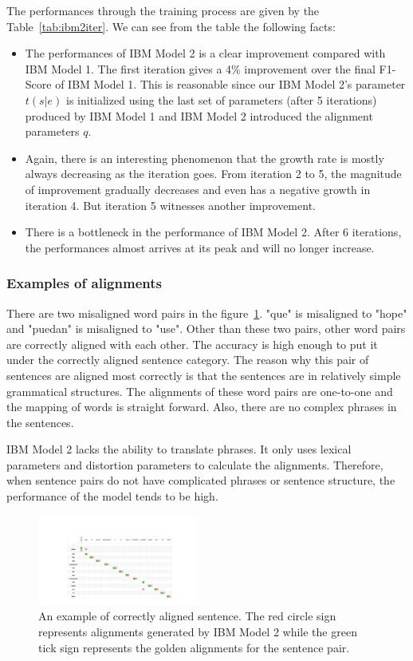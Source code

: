 The performances through the training process are given by the Table~\ref{tab:ibm2iter}. We can see from the table the following facts:
\begin{itemize}
    \item The performances of IBM Model 2 is a clear improvement compared with IBM Model 1. The first iteration gives a 4\% improvement over the final F1-Score of IBM Model 1. This is reasonable since our IBM Model 2's parameter $t(s|e)$ is initialized using the last set of parameters (after 5 iterations) produced by IBM Model 1 and IBM Model 2 introduced the alignment parameters $q$.
    \item Again, there is an interesting phenomenon that the growth rate is mostly always decreasing as the iteration goes. From iteration 2 to 5, the magnitude of improvement gradually decreases and even has a negative growth in iteration 4. But iteration 5 witnesses another improvement. 
    \item There is a bottleneck in the performance of IBM Model 2. After $6$ iterations, the performances almost arrives at its peak and will no longer increase. 
\end{itemize}

\subsubsection{\textbf{Examples of alignments}}

There are two misaligned word pairs in the figure~\ref{fig:align1}. "que" is misaligned to "hope" and "puedan" is misaligned to "use". Other than these two pairs, other word pairs are correctly aligned with each other. The accuracy is high enough to put it under the correctly aligned sentence category. The reason why this pair of sentences are aligned most correctly is that the sentences are in relatively simple grammatical structures. The alignments of these word pairs are one-to-one and the mapping of words is straight forward. Also, there are no complex phrases in the sentences. 

IBM Model 2 lacks the ability to translate phrases. It only uses lexical parameters and distortion parameters to calculate the alignments. Therefore, when sentence pairs do not have complicated phrases or sentence structure, the performance of the model tends to be high.

\begin{figure}[!ht]
    \centering
    \includegraphics[width=0.47\textwidth]{files/figs/1.pdf}
    \caption[]%
    {\small An example of correctly aligned sentence. The red circle sign represents alignments generated by IBM Model 2 while the green tick sign represents the golden alignments for the sentence pair.}
    \label{fig:align1}
\end{figure}

